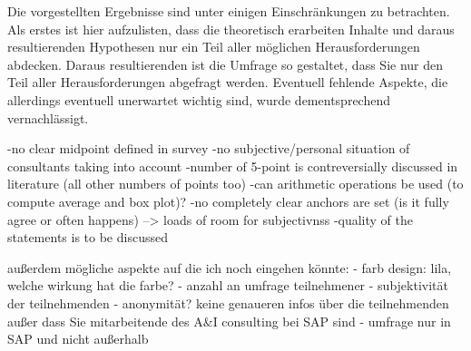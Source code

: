 \documentclass[../main.tex]{subfiles}
\begin{document}
Die vorgestellten Ergebnisse sind unter einigen Einschränkungen zu betrachten.
Als erstes ist hier aufzulisten, dass die theoretisch erarbeiten Inhalte und daraus resultierenden Hypothesen nur ein Teil aller möglichen Herausforderungen abdecken.
Daraus resultierenden ist die Umfrage so gestaltet, dass Sie nur den Teil aller Herausforderungen abgefragt werden.
Eventuell fehlende Aspekte, die allerdings eventuell unerwartet wichtig sind, wurde dementsprechend vernachlässigt.

-no clear midpoint defined in survey
-no subjective/personal situation of consultants taking into account
-number of 5-point is contreversially discussed in literature (all other numbers of points too)
-can arithmetic operations be used (to compute average and box plot)?
-no completely clear anchors are set (is it fully agree or often happens) --> loads of room for subjectivnss
-quality of the statements is to be discussed
\autocite{tanujaya2022likert}

außerdem mögliche aspekte auf die ich noch eingehen könnte:
- farb design: lila, welche wirkung hat die farbe?
- anzahl an umfrage teilnehmener
- subjektivität der teilnehmenden
- anonymität? keine genaueren infos über die teilnehmenden außer dass Sie mitarbeitende des A\&I consulting bei SAP sind
- umfrage nur in SAP und nicht außerhalb
\end{document}
